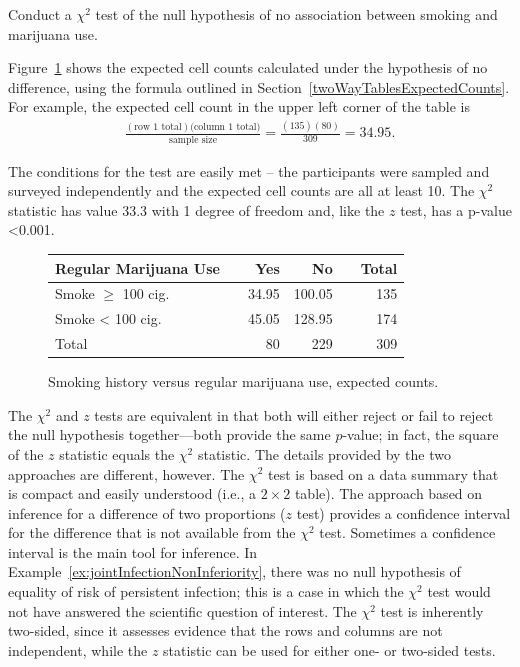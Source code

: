 \begin{examplewrap}
\begin{nexample}{Conduct a $\chi^2$ test of the null hypothesis of no association between smoking and marijuana use.}\label{ex:smoke100RegMarijChiSquared}

Figure~\ref{figure:smoke100RegMarijuanaExpected} shows the expected cell counts calculated under the hypothesis of no difference, using the formula outlined in Section~\ref{twoWayTablesExpectedCounts}.  For example, the expected cell count in the upper left corner of the table is
\begin{align*}
  \frac{(\text{row 1 total})(\text{column 1 total)}}{\text{sample size}} =
  \frac{(135)(80)}{309} = 34.95.
\end{align*}

The conditions for the test are easily met -- the participants were sampled and surveyed independently and the expected cell counts are all at least 10.  The $\chi^2$ statistic  has value 33.3 with 1 degree of freedom and, like the $z$ test, has a p-value <0.001.
\end{nexample}
\end{examplewrap}


\begin{figure}[ht]
  \centering
  \begin{tabular}{ll rrr r}
    \hline
    Regular Marijuana Use  & \hspace{2mm} & Yes & No & \hspace{2mm} & Total \\
    \hline
    Smoke $\geq$ 100 cig. & & 34.95 & 100.05 &  & 135  \\
    Smoke < 100 cig. & & 45.05 & 128.95 &  &  174  \\
        Total & & 80 & 229 & & 309 \\
    \hline
  \end{tabular}
    \caption{Smoking history versus regular marijuana use, expected counts.}
    \label{figure:smoke100RegMarijuanaExpected}
\end{figure}

The $\chi^2$ and $z$ tests are equivalent in that both will either reject or fail to reject the null hypothesis together---both provide the same $p$-value; in fact, the square of the $z$ statistic equals the $\chi^2$ statistic.  The details provided by the two approaches are different, however.   The $\chi^2$ test is based on a data summary that is compact and easily understood (i.e., a $2 \times 2$ table).  The approach based on inference for a difference of two proportions ($z$ test) provides a confidence interval for the difference that is not available from the $\chi^2$ test. Sometimes a confidence interval is the main tool for inference.  In Example~\ref{ex:jointInfectionNonInferiority}, there was no null hypothesis of equality of risk of persistent infection; this is a case in which the $\chi^2$ test would not have answered the scientific question of interest. The $\chi^2$ test is inherently two-sided, since it assesses evidence that the rows and columns are not independent, while the $z$ statistic can be used for either one- or two-sided tests.

